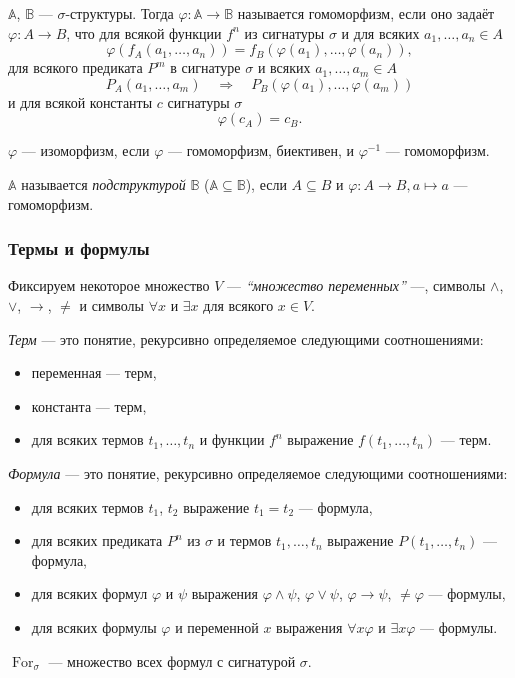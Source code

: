 \documentclass[a4paper,11pt]{article}
\newcommand{\Formu}{\mathop{\mathrm{For}}}
\begin{document}
\begin{definition}
	$\mathbb{A}$, $\mathbb{B}$ --- $\sigma$-структуры. Тогда $\varphi: \mathbb{A} \to \mathbb{B}$ называется гомоморфизм, если оно задаёт $\varphi: A \to B$, что для всякой функции $f^n$ из сигнатуры $\sigma$ и для всяких $a_1, \dots, a_n \in A$
	\[\varphi(f_A(a_1, \dots, a_n)) = f_B(\varphi(a_1), \dots, \varphi(a_n)),\]
	для всякого предиката $P^m$ в сигнатуре $\sigma$ и всяких $a_1, \dots, a_m \in A$
	\[P_A(a_1, \dots, a_m) \quad \Longrightarrow \quad P_B(\varphi(a_1), \dots, \varphi(a_m))\]
	и для всякой константы $c$ сигнатуры $\sigma$
	\[\varphi(c_A) = c_B.\]

	$\varphi$ --- изоморфизм, если $\varphi$ --- гомоморфизм, биективен, и $\varphi^{-1}$ --- гомоморфизм.

	$\mathbb{A}$ называется \emph{подструктурой} $\mathbb{B}$ ($\mathbb{A} \subseteq \mathbb{B}$), если $A \subseteq B$ и $\varphi: A \to B, a \mapsto a$ --- гомоморфизм.
\end{definition}

\subsubsection{Термы и формулы}

\begin{definition}
	Фиксируем некоторое множество $V$ --- \emph{``множество переменных''} ---, символы $\wedge$, $\vee$, $\to$, $\neq$ и символы $\forall x$ и $\exists x$ для всякого $x \in V$.
	
	\emph{Терм} --- это понятие, рекурсивно определяемое следующими соотношениями:
	\begin{itemize}
		\item переменная --- терм,
		\item константа --- терм,
		\item для всяких термов $t_1, \dots, t_n$ и функции $f^n$ выражение $f(t_1, \dots, t_n)$ --- терм.
	\end{itemize}

	\emph{Формула} --- это понятие, рекурсивно определяемое следующими соотношениями:
	\begin{itemize}
		\item для всяких термов $t_1$, $t_2$ выражение $t_1 = t_2$ --- формула,
		\item для всяких предиката $P^n$ из $\sigma$ и термов $t_1, \dots, t_n$ выражение $P(t_1, \dots, t_n)$ --- формула,
		\item для всяких формул $\varphi$ и $\psi$ выражения $\varphi \wedge \psi$, $\varphi \vee \psi$, $\varphi \to \psi$, $\neq \varphi$ --- формулы,
		\item для всяких формулы $\varphi$ и переменной $x$ выражения $\forall x \varphi$ и $\exists x \varphi$ --- формулы.
	\end{itemize}
	$\Formu_\sigma$ --- множество всех формул с сигнатурой $\sigma$.
\end{definition}
\end{document}
